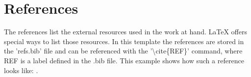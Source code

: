 \documentclass[twocolumn]{article}
\begin{document}
\section{References}
The references list the external resources used in the work at hand. \LaTeX$ $  offers special ways to list those resources. In this template the references are stored in the 'refs.bib' file and can be referenced with the '\textbackslash$ $cite\{REF\}' command, where REF is a label defined in the .bib file. This example shows how such a reference looks like: \cite{exa}.



\end{document}
